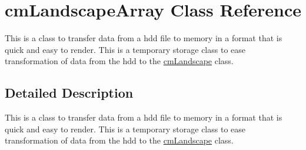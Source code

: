 \hypertarget{classcm_landscape_array}{
\section{cmLandscapeArray Class Reference}
\label{classcm_landscape_array}
}


This is a class to transfer data from a hdd file to memory in a format that is quick and easy to render. This is a temporary storage class to ease transformation of data from the hdd to the \hyperlink{classcm_landscape}{cmLandscape} class.  




\subsection{Detailed Description}
This is a class to transfer data from a hdd file to memory in a format that is quick and easy to render. This is a temporary storage class to ease transformation of data from the hdd to the \hyperlink{classcm_landscape}{cmLandscape} class. 